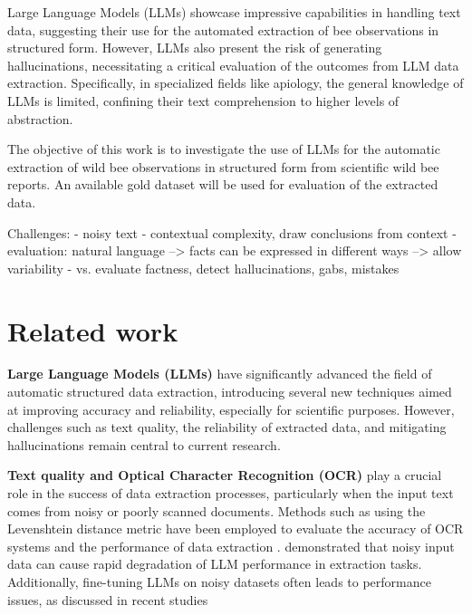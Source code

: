 \documentclass{article}
\begin{document}
Large Language Models (LLMs) showcase impressive capabilities in handling text data, suggesting their use for the
automated extraction of bee observations in structured form. However, LLMs also present the risk of generating
hallucinations, necessitating a critical evaluation of the outcomes from LLM data extraction. Specifically, in specialized
fields like apiology, the general knowledge of LLMs is limited, confining their text comprehension to higher levels of
abstraction.

The objective of this work is to investigate the use of LLMs for the automatic extraction of wild bee observations
in structured form from scientific wild bee reports. An available gold dataset will be used for evaluation of the
extracted data. 


Challenges:
- noisy text
- contextual complexity, draw conclusions from context
- evaluation: natural language --> facts can be expressed in different ways --> allow variability 
    - vs. evaluate factness, detect hallucinations, gabs, mistakes


\section{Related work}

\textbf{Large Language Models (LLMs)} have significantly advanced the field of automatic structured data extraction, introducing several new techniques aimed at improving accuracy and reliability, especially for scientific purposes. However, challenges such as text quality, the reliability of extracted data, and mitigating hallucinations remain central to current research.

\textbf{Text quality and Optical Character Recognition (OCR)} play a crucial role in the success of data extraction processes, particularly when the input text comes from noisy or poorly scanned documents. Methods such as using the Levenshtein distance metric have been employed to evaluate the accuracy of OCR systems and the performance of data extraction \cite{biswas2024robustnessstructureddataextraction}. \cite{10.1145/3639856.3639889} demonstrated that noisy input data can cause rapid degradation of LLM performance in extraction tasks. Additionally, fine-tuning LLMs on noisy datasets often leads to performance issues, as discussed in recent studies \cite{schilling2024text}
\end{document}
